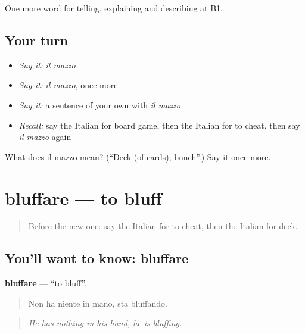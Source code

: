 \begin{grammarlens}[title={What you've built}]
One more word for telling, explaining and describing at B1.
\end{grammarlens}

\subsection*{Your turn}
\begin{itemize}
\raggedright
  \item \emph{Say it:} \emph{il mazzo}
  \item \emph{Say it:} \emph{il mazzo}, once more
  \item \emph{Say it:} a sentence of your own with \emph{il mazzo}
  \item \emph{Recall:} say the Italian for board game, then the Italian for to cheat, then say \emph{il mazzo} again
\end{itemize}

\begin{tcolorbox}[breakable,colback=teal!4,colframe=teal!35!black,title={Before you move on}]
What does il mazzo mean? (\textquotedblleft{}Deck (of cards); bunch\textquotedblright{}.) Say it once more.
\end{tcolorbox}
\section[bluffare]{bluffare — to bluff}

\label{lesson:IT-C504-bluffare}



\begin{quote}
Before the new one: say the Italian for to cheat, then the Italian for deck.
\end{quote}

\subsection*{You'll want to know: bluffare}
\textbf{bluffare} — \textquotedblleft{}to bluff\textquotedblright{}.

\begin{quote}
Non ha niente in mano, sta bluffando.
\end{quote}

\begin{quote}
\emph{He has nothing in his hand, he is bluffing.}
\end{quote}

